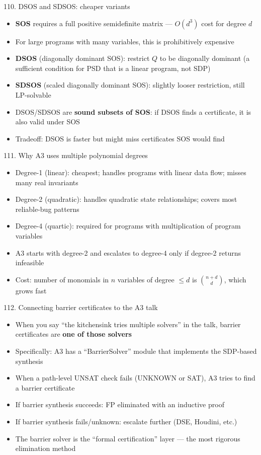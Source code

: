 \documentclass[aspectratio=169]{beamer}
\begin{document}
\begin{frame}{110. DSOS and SDSOS: cheaper variants}
\begin{itemize}
  \item \textbf{SOS} requires a full positive semidefinite matrix --- \(O(d^3)\) cost for degree \(d\)
  \item For large programs with many variables, this is prohibitively expensive
  \item \textbf{DSOS} (diagonally dominant SOS): restrict \(Q\) to be diagonally dominant (a sufficient condition for PSD that is a linear program, not SDP)
  \item \textbf{SDSOS} (scaled diagonally dominant SOS): slightly looser restriction, still LP-solvable
  \item DSOS/SDSOS are \textbf{sound subsets of SOS}: if DSOS finds a certificate, it is also valid under SOS
  \item Tradeoff: DSOS is faster but might miss certificates SOS would find
\end{itemize}
\end{frame}

\begin{frame}{111. Why A3 uses multiple polynomial degrees}
\begin{itemize}
  \item Degree-1 (linear): cheapest; handles programs with linear data flow; misses many real invariants
  \item Degree-2 (quadratic): handles quadratic state relationships; covers most reliable-bug patterns
  \item Degree-4 (quartic): required for programs with multiplication of program variables
  \item A3 starts with degree-2 and escalates to degree-4 only if degree-2 returns infeasible
  \item Cost: number of monomials in \(n\) variables of degree \(\le d\) is \(\binom{n+d}{d}\), which grows fast
\end{itemize}
\end{frame}

\begin{frame}{112. Connecting barrier certificates to the A3 talk}
\begin{itemize}
  \item When you say ``the kitchensink tries multiple solvers'' in the talk, barrier certificates are \textbf{one of those solvers}
  \item Specifically: A3 has a ``BarrierSolver'' module that implements the SDP-based synthesis
  \item When a path-level UNSAT check fails (UNKNOWN or SAT), A3 tries to find a barrier certificate
  \item If barrier synthesis succeeds: FP eliminated with an inductive proof
  \item If barrier synthesis fails/unknown: escalate further (DSE, Houdini, etc.)
  \item The barrier solver is the ``formal certification'' layer --- the most rigorous elimination method
\end{itemize}
\end{frame}
\end{document}

